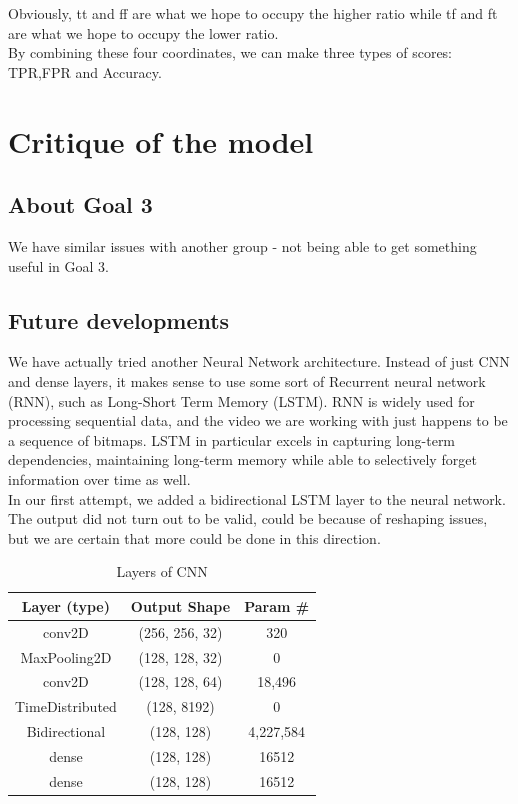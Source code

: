 \documentclass[11pt,a4paper]{scrartcl}
\begin{document}
Obviously, tt and ff are what we hope to occupy the higher ratio while tf and ft are what we hope to occupy the lower ratio.\\

By combining these four coordinates, we can make three types of scores: TPR,FPR and Accuracy.
\newpage

\section{Critique of the model}

\subsection{About Goal 3}
We have similar issues with another group - not being able to get something useful in Goal 3.

\subsection{Future developments}
We have actually tried another Neural Network architecture. Instead of just CNN and dense layers, it makes sense to use some sort of Recurrent neural network (RNN), such as Long-Short Term Memory (LSTM). RNN is widely used for processing sequential data, and the video we are working with just happens to be a sequence of bitmaps. LSTM in particular excels in capturing long-term dependencies, maintaining long-term memory while able to selectively forget information over time as well.\\

In our first attempt, we added a bidirectional LSTM layer to the neural network. The output did not turn out to be valid, could be because of reshaping issues, but we are certain that more could be done in this direction.

\begin{table}[h]
\centering
\begin{tabular}{ccc}
\toprule
\textbf{Layer (type)} & \textbf{Output Shape} & \textbf{Param \#} \\
\midrule
conv2D & (256, 256, 32) & 320 \\
MaxPooling2D & (128, 128, 32) & 0 \\
conv2D & (128, 128, 64) & 18,496 \\
TimeDistributed & (128, 8192) & 0 \\
Bidirectional & (128, 128) & 4,227,584 \\
dense & (128, 128) & 16512 \\
dense & (128, 128) & 16512 \\
\bottomrule
\end{tabular}
\caption{Layers of CNN}
\end{table}

\printbibliography[]
\vfill
\end{document}
